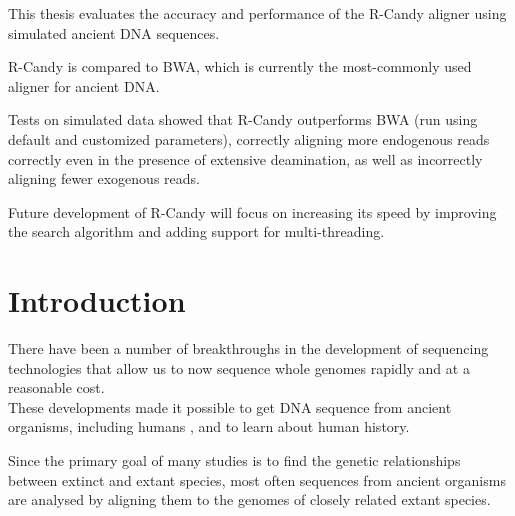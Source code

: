 \documentclass[11pt,a4paper]{report}
\begin{document}
This thesis evaluates the accuracy and performance of the R-Candy aligner 
using simulated ancient DNA sequences. 

R-Candy is compared to BWA, which is currently the most-commonly used 
aligner for ancient DNA.

Tests on simulated data showed that R-Candy outperforms BWA (run using 
default and customized parameters), correctly aligning more endogenous 
reads correctly even in the presence of extensive deamination, as well
as incorrectly aligning fewer exogenous reads.

Future development of R-Candy will focus on increasing its speed by 
improving the search algorithm and adding support for multi-threading.



\newpage\null\thispagestyle{empty}\newpage

\tableofcontents
\listoftables
\newpage\null\thispagestyle{empty}\newpage
\listoffigures
{} 



\section{Introduction} \label{Introduction}


There have been a number of breakthroughs in the development of sequencing 
technologies that allow us to now sequence whole genomes rapidly and at a 
reasonable cost\cite{NGS}\cite{454}\cite{NGS2}.
\\
These developments made it possible to get DNA sequence from ancient 
organisms, including humans \cite{AncientDNA}\cite{fish2human}, and  
to learn about human history\cite{impactOFhg}\cite{ourGenome}\cite{SNP}.

Since the primary goal of many studies is to find the genetic 
relationships between extinct and extant species, most often sequences 
from ancient organisms are analysed by aligning them to the genomes of 
closely related extant species\cite{Neanthertal}\cite{AncientDNA}.
\end{document}
